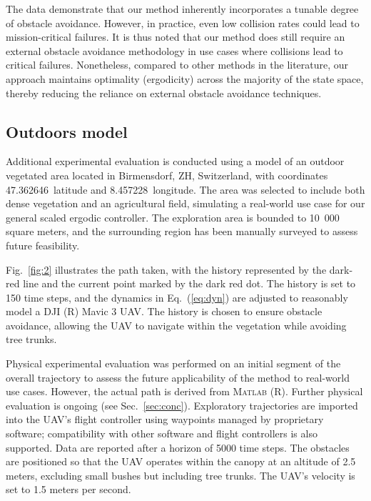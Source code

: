 \documentclass[letterpaper,10pt,conference,twoside]{IEEEtran}
\theoremstyle{definition}
\begin{document}
The data demonstrate that our method inherently incorporates a tunable degree of obstacle avoidance. However, in practice, even low collision rates could lead to mission-critical failures. It is thus noted that our method does still require an external obstacle avoidance methodology in use cases where collisions lead to critical failures. Nonetheless, compared to other methods in the literature, our approach maintains optimality (ergodicity) across the majority of the state space, thereby reducing the reliance on external obstacle avoidance techniques.

\subsection{Outdoors model}\label{sec:res3}
\noindent
Additional experimental evaluation is conducted using a model of an outdoor vegetated area located in Birmensdorf, ZH, Switzerland, with coordinates 47.362646\textdegree~latitude and 8.457228\textdegree~longitude. The area was selected to include both dense vegetation and an agricultural field, simulating a real-world use case for our general scaled ergodic controller. The exploration area is bounded to 10~000 square meters, and the surrounding region has been manually surveyed to assess future feasibility.

Fig.~\ref{fig:2} illustrates the path taken, with the history represented by the dark-red line and the current point marked by the dark red dot. The history is set to 150 time steps, and the dynamics in Eq.~(\ref{eq:dyn}) are adjusted to reasonably model a DJI (R) Mavic 3 UAV. The history is chosen to ensure obstacle avoidance, allowing the UAV to navigate within the vegetation while avoiding tree trunks.

Physical experimental evaluation was performed on an initial segment of the overall trajectory to assess the future applicability of the method to real-world use cases. However, the actual path is derived from \textsc{Matlab} (R). Further physical evaluation is ongoing (see Sec.~\ref{sec:conc}). Exploratory trajectories are imported into the UAV's flight controller using waypoints managed by proprietary software; compatibility with other software and flight controllers is also supported. Data are reported after a horizon of 5000 time steps. The obstacles are positioned so that the UAV operates within the canopy at an altitude of 2.5 meters, excluding small bushes but including tree trunks. The UAV's velocity is set to 1.5 meters per second.
\end{document}
